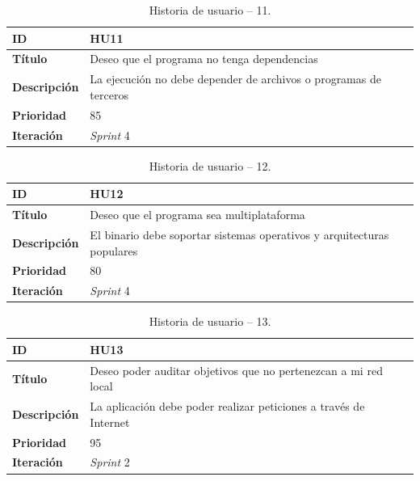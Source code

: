 \begin{table}[H]
    \begin{center}
        \begin{tabularx}{\textwidth}{| l | X |}
            \hline
            \textbf{ID}             & HU11 \\ \hline
            \textbf{Título}         & Deseo que el programa no tenga dependencias \\ \hline
            \textbf{Descripción}    & La ejecución no debe depender de archivos o programas de terceros \\ \hline
            \textbf{Prioridad}      & 85 \\ \hline
            \textbf{Iteración}      & \textit{Sprint} 4\\ \hline
        \end{tabularx}
    \end{center}
    \caption{Historia de usuario -- 11.}
    \label{tab:hu11}
\end{table}

\begin{table}[H]
    \begin{center}
        \begin{tabularx}{\textwidth}{| l | X |}
            \hline
            \textbf{ID}             & HU12 \\ \hline
            \textbf{Título}         & Deseo que el programa sea multiplataforma \\ \hline
            \textbf{Descripción}    & El binario debe soportar sistemas operativos y arquitecturas populares\\ \hline
            \textbf{Prioridad}      & 80 \\ \hline
            \textbf{Iteración}      & \textit{Sprint} 4\\ \hline
        \end{tabularx}
    \end{center}
    \caption{Historia de usuario -- 12.}
    \label{tab:hu12}
\end{table}

\begin{table}[H]
    \begin{center}
        \begin{tabularx}{\textwidth}{| l | X |}
            \hline
            \textbf{ID}             & HU13 \\ \hline
            \textbf{Título}         & Deseo poder auditar objetivos que no pertenezcan a mi red local \\ \hline
            \textbf{Descripción}    & La aplicación debe poder realizar peticiones a través de Internet \\ \hline
            \textbf{Prioridad}      & 95 \\ \hline
            \textbf{Iteración}      & \textit{Sprint} 2\\ \hline
        \end{tabularx}
    \end{center}
    \caption{Historia de usuario -- 13.}
    \label{tab:hu13}
\end{table}

